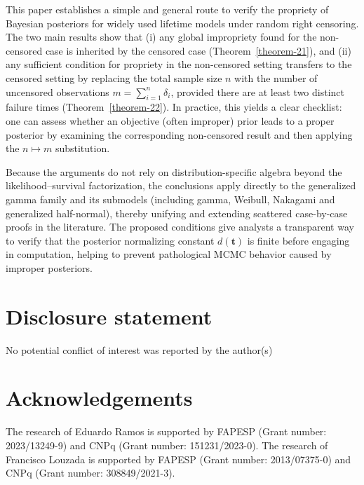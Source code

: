 \documentclass[]{interact}
\newcommand{\bs}{\boldsymbol}
\theoremstyle{plain}%
\theoremstyle{definition}
\theoremstyle{remark}
\begin{document}
This paper establishes a simple and general route to verify the propriety of Bayesian posteriors for widely used lifetime models under random right censoring. The two main results show that (i) any global impropriety found for the non-censored case is inherited by the censored case (Theorem~\ref{theorem-21}), and (ii) any sufficient condition for propriety in the non-censored setting transfers to the censored setting by replacing the total sample size $n$ with the number of uncensored observations $m=\sum_{i=1}^n \delta_i$, provided there are at least two distinct failure times (Theorem~\ref{theorem-22}). In practice, this yields a clear checklist: one can assess whether an objective (often improper) prior leads to a proper posterior by examining the corresponding non-censored result and then applying the $n\mapsto m$ substitution.

Because the arguments do not rely on distribution-specific algebra beyond the likelihood–survival factorization, the conclusions apply directly to the generalized gamma family and its submodels (including gamma, Weibull, Nakagami and generalized half-normal), thereby unifying and extending scattered case-by-case proofs in the literature. The proposed conditions give analysts a transparent way to verify that the posterior normalizing constant $d(\bs t)$ is finite before engaging in computation, helping to prevent pathological MCMC behavior caused by improper posteriors.


\section*{Disclosure statement}

No potential conflict of interest was reported by the author(s)

\section*{Acknowledgements}

 The research of 
 Eduardo Ramos is supported by FAPESP
(Grant number: 2023/13249-9) and CNPq (Grant number:  151231/2023-0). The research of Francisco Louzada is supported by FAPESP (Grant number: 2013/07375-0) and CNPq (Grant number: 308849/2021-3).





\appendix



\section{ }
\end{document}
